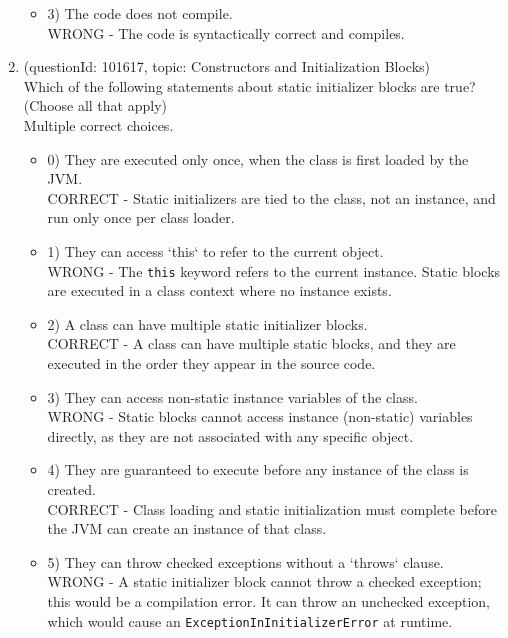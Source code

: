 \documentclass[12pt]{article}
\begin{document}
\begin{enumerate}[label=(\arabic*)]
\begin{itemize}
\item 3) The code does not compile.
 \\ 
WRONG - The code is syntactically correct and compiles.

\end{itemize}
\item (questionId: 101617, topic: Constructors and Initialization Blocks) \\ 
Which of the following statements about static initializer blocks are true? (Choose all that apply)
\\ \noindent Multiple correct choices. 
\begin{itemize}
\item 0) They are executed only once, when the class is first loaded by the JVM.
 \\ 
CORRECT - Static initializers are tied to the class, not an instance, and run only once per class loader.

\item 1) They can access `this` to refer to the current object.
 \\ 
WRONG - The \verb|this| keyword refers to the current instance. Static blocks are executed in a class context where no instance exists.

\item 2) A class can have multiple static initializer blocks.
 \\ 
CORRECT - A class can have multiple static blocks, and they are executed in the order they appear in the source code.

\item 3) They can access non-static instance variables of the class.
 \\ 
WRONG - Static blocks cannot access instance (non-static) variables directly, as they are not associated with any specific object.

\item 4) They are guaranteed to execute before any instance of the class is created.
 \\ 
CORRECT - Class loading and static initialization must complete before the JVM can create an instance of that class.

\item 5) They can throw checked exceptions without a `throws` clause.
 \\ 
WRONG - A static initializer block cannot throw a checked exception; this would be a compilation error. It can throw an unchecked exception, which would cause an \verb|ExceptionInInitializerError| at runtime.


\end{itemize}
\end{enumerate}
\end{document}
